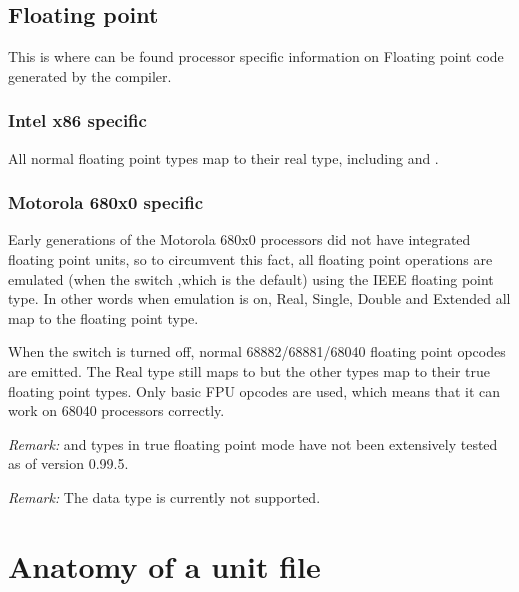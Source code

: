 \documentclass{report}
\begin{document}
\section{ Floating point }

This is where can be found processor specific information on Floating
point code generated by the compiler.

\subsection{ Intel x86 specific }

All normal floating point types map to their real type, including
 and .

\subsection{ Motorola 680x0 specific }

Early generations of the Motorola 680x0 processors did not have integrated
floating point units, so to circumvent this fact, all floating point
operations are emulated (when the  switch ,which is the default)
using the IEEE  floating point type. In other words when
emulation is on, Real, Single, Double and Extended all map to the
 floating point type.

When the  switch is turned off, normal 68882/68881/68040
floating point opcodes are emitted. The Real type still maps to
 but the other types map to their true floating point
types. Only basic FPU opcodes are used, which means that it can
work on 68040 processors correctly.

\emph{ Remark: }  and  types in true floating
point mode have not been extensively tested as of version 0.99.5.

\emph{ Remark: } The  data type is currently not supported.

\appendix


\chapter{Anatomy of a unit file}
\label{ch:AppA}
\end{document}
